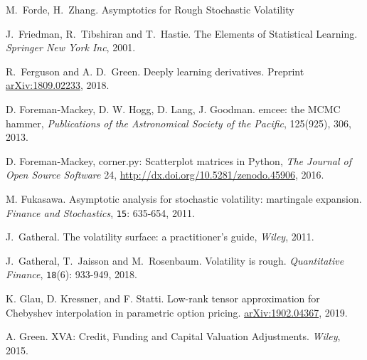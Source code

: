 \documentclass{article}
\theoremstyle{remark}
\begin{document}
\begin{thebibliography}{99}
 M.~Forde, H.~Zhang. Asymptotics for Rough Stochastic Volatility

J.~Friedman, R.~Tibshiran and  T.~Hastie. The Elements of Statistical Learning. \textit{Springer New York Inc}, 2001.

 R.~Ferguson and A. D.~Green. Deeply learning derivatives.
  Preprint \href{https://arxiv.org/abs/1809.02233}{arXiv:1809.02233}, 2018.

 D. Foreman-Mackey, D. W. Hogg, D. Lang, J. Goodman.
  emcee: the MCMC hammer, \emph{Publications of the Astronomical Society of
    the Pacific}, 125(925), 306, 2013.

 D. Foreman-Mackey, corner.py: Scatterplot matrices in Python,
  \emph{The Journal of Open Source Software} 24,
  \url{http://dx.doi.org/10.5281/zenodo.45906}, 2016.

M. Fukasawa.
Asymptotic analysis for stochastic volatility: martingale expansion.
\textit{Finance and Stochastics}, {\tt 15}: 635-654, 2011.

 J.~Gatheral. The volatility surface: a practitioner's guide,
\textit{Wiley}, 2011.


J.~Gatheral, T.~Jaisson  and M.~Rosenbaum.
Volatility is rough.
\textit{Quantitative Finance}, {\tt 18}(6): 933-949, 2018.


K. Glau, D. Kressner, and F. Statti.
Low-rank tensor approximation for Chebyshev interpolation in parametric option pricing.
\href{https://arxiv.org/pdf/1902.04367.pdf}{arXiv:1902.04367}, 2019.

A. Green. XVA: Credit, Funding and Capital Valuation Adjustments. \textit{Wiley}, 2015.

%


\end{thebibliography}
\end{document}
